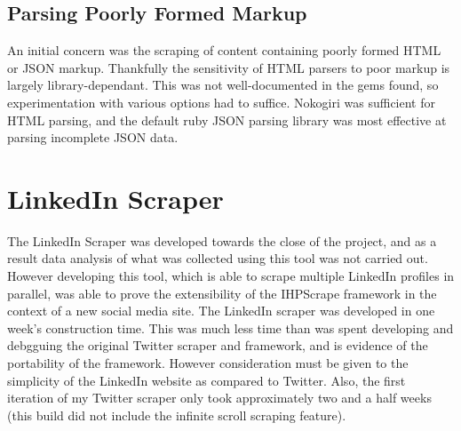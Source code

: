 \subsection{Parsing Poorly Formed Markup}

An initial concern was the scraping of content containing poorly formed HTML or JSON markup. Thankfully the sensitivity of HTML parsers to poor markup is largely library-dependant. This was not well-documented in the gems found, so experimentation with various options had to suffice. Nokogiri was sufficient for HTML parsing, and the default ruby JSON parsing library was most effective at parsing incomplete JSON data.










\section{LinkedIn Scraper}

The LinkedIn Scraper was developed towards the close of the project, and as a result data analysis of what was collected using this tool was not carried out. However developing this tool, which is able to scrape multiple LinkedIn profiles in parallel, was able to prove the extensibility of the IHPScrape framework in the context of a new social media site. The LinkedIn scraper was developed in one week's construction time. This was much less time than was spent developing and debgguing the original Twitter scraper and framework, and is evidence of the portability of the framework. However consideration must be given to the simplicity of the LinkedIn website as compared to Twitter. Also, the first iteration of my Twitter scraper only took approximately two and a half weeks (this build did not include the infinite scroll scraping feature). 

